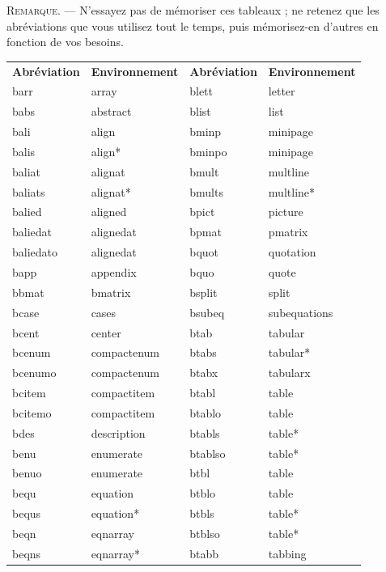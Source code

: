 \documentclass[11pt,french]{article}
\begin{document}
\textsc{Remarque}. --- N'essayez pas de mémoriser ces tableaux ; ne retenez que les abréviations que vous utilisez tout le temps, puis mémorisez-en d'autres en fonction de vos besoins.

\begin{table}[H]
\small
\centering
\begin{tabular}{llll}
\textbf{Abréviation} & \textbf{Environnement} & \textbf{Abréviation} & \textbf{Environnement} \\
\cmidrule[0.5pt](lr){1-1} \cmidrule[0.5pt](lr){2-2} \cmidrule[0.5pt](lr){3-3} \cmidrule[0.5pt](lr){4-4}
barr      & array       & blett   & letter \\
babs      & abstract    & blist   & list \\
bali      & align       & bminp   & minipage \\
balis     & align*      & bminpo  & minipage \\
baliat    & alignat     & bmult   & multline \\
baliats   & alignat*    & bmults  & multline* \\
balied    & aligned     & bpict   & picture \\
baliedat  & alignedat   & bpmat   & pmatrix \\
baliedato & alignedat   & bquot   & quotation \\
bapp      & appendix    & bquo    & quote \\
bbmat     & bmatrix     & bsplit  & split \\
bcase     & cases       & bsubeq  & subequations \\
bcent     & center      & btab    & tabular \\
bcenum    & compactenum & btabs   & tabular* \\
bcenumo   & compactenum & btabx   & tabularx \\
bcitem    & compactitem & btabl   & table \\
bcitemo   & compactitem & btablo  & table \\
bdes      & description & btabls  & table* \\
benu      & enumerate   & btablso & table* \\
benuo     & enumerate   & btbl    & table \\
bequ      & equation    & btblo   & table \\
bequs     & equation*   & btbls   & table* \\
beqn      & eqnarray    & btblso  & table* \\
beqns     & eqnarray*   & btabb   & tabbing \\

\end{tabular}
\end{table}
\end{document}
